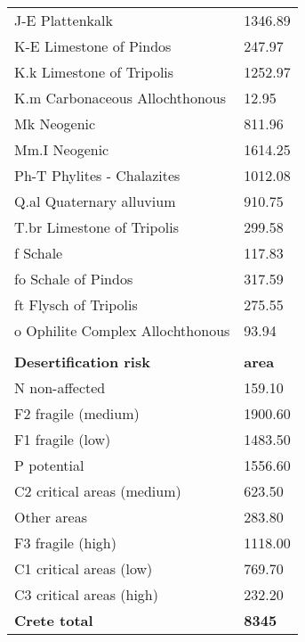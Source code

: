 \begin{longtable}{ll}
J-E Plattenkalk                                    & 1346.89          \\
K-E Limestone of Pindos                            & 247.97           \\
K.k Limestone of Tripolis                          & 1252.97          \\
K.m Carbonaceous Allochthonous                     & 12.95            \\
Mk Neogenic                                        & 811.96           \\
Mm.I Neogenic                                      & 1614.25          \\
Ph-T Phylites - Chalazites                         & 1012.08          \\
Q.al Quaternary alluvium                           & 910.75           \\
T.br  Limestone of Tripolis                        & 299.58           \\
f Schale                                           & 117.83           \\
fo Schale of Pindos                                & 317.59           \\
ft Flysch of Tripolis                              & 275.55           \\
o Ophilite Complex Allochthonous                   & 93.94            \\
                                                   &                  \\
\textbf{Desertification risk}                      & \textbf{area}    \\
N non-affected                                     & 159.10           \\
F2 fragile (medium)                                & 1900.60          \\
F1 fragile (low)                                   & 1483.50          \\
P potential                                        & 1556.60          \\
C2 critical areas (medium)                         & 623.50           \\
Other areas                                        & 283.80           \\
F3 fragile (high)                                  & 1118.00          \\
C1 critical areas (low)                            & 769.70           \\
C3 critical areas (high)                           & 232.20           \\
\textbf{Crete total}                               & \textbf{8345}




\end{longtable}


